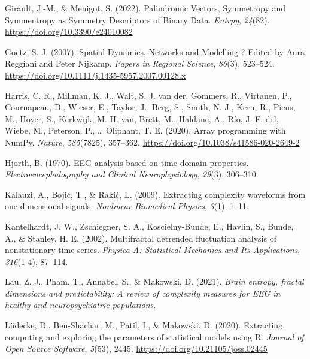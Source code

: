 \documentclass[
  man]{apa6}
\newlength{\cslhangindent}
\newlength{\cslentryspacingunit} %
\newenvironment{CSLReferences}[2] %
 {%
  \setlength{\parindent}{0pt}
  \ifodd #1
  \let\oldpar\par
  \def\par{\hangindent=\cslhangindent\oldpar}
  \fi
  \setlength{\parskip}{#2\cslentryspacingunit}
 }%
 {}
\begin{document}
\begin{CSLReferences}{1}{0}
\leavevmode{}%
Girault, J.-M., \& Menigot, S. (2022). Palindromic Vectors, Symmetropy and Symmentropy as Symmetry Descriptors of Binary Data. \emph{Entrpy}, \emph{24}(82). \url{https://doi.org/10.3390/e24010082}

\leavevmode{}%
Goetz, S. J. (2007). Spatial Dynamics, Networks and Modelling ? Edited by Aura Reggiani and Peter Nijkamp. \emph{Papers in Regional Science}, \emph{86}(3), 523--524. \url{https://doi.org/10.1111/j.1435-5957.2007.00128.x}

\leavevmode{}%
Harris, C. R., Millman, K. J., Walt, S. J. van der, Gommers, R., Virtanen, P., Cournapeau, D., Wieser, E., Taylor, J., Berg, S., Smith, N. J., Kern, R., Picus, M., Hoyer, S., Kerkwijk, M. H. van, Brett, M., Haldane, A., Río, J. F. del, Wiebe, M., Peterson, P., \ldots{} Oliphant, T. E. (2020). Array programming with {NumPy}. \emph{Nature}, \emph{585}(7825), 357--362. \url{https://doi.org/10.1038/s41586-020-2649-2}

\leavevmode{}%
Hjorth, B. (1970). EEG analysis based on time domain properties. \emph{Electroencephalography and Clinical Neurophysiology}, \emph{29}(3), 306--310.

\leavevmode{}%
Kalauzi, A., Bojić, T., \& Rakić, L. (2009). Extracting complexity waveforms from one-dimensional signals. \emph{Nonlinear Biomedical Physics}, \emph{3}(1), 1--11.

\leavevmode{}%
Kantelhardt, J. W., Zschiegner, S. A., Koscielny-Bunde, E., Havlin, S., Bunde, A., \& Stanley, H. E. (2002). Multifractal detrended fluctuation analysis of nonstationary time series. \emph{Physica A: Statistical Mechanics and Its Applications}, \emph{316}(1-4), 87--114.

\leavevmode{}%
Lau, Z. J., Pham, T., Annabel, S., \& Makowski, D. (2021). \emph{Brain entropy, fractal dimensions and predictability: A review of complexity measures for EEG in healthy and neuropsychiatric populations}.

\leavevmode{}%
Lüdecke, D., Ben-Shachar, M., Patil, I., \& Makowski, D. (2020). Extracting, computing and exploring the parameters of statistical models using {R}. \emph{Journal of Open Source Software}, \emph{5}(53), 2445. \url{https://doi.org/10.21105/joss.02445}


\end{CSLReferences}
\end{document}
